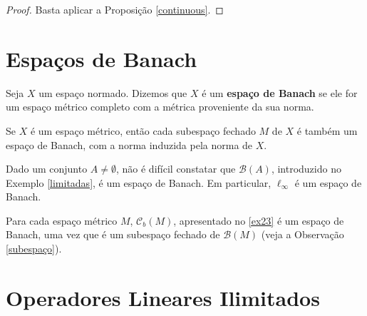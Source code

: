 \begin{proof}
Basta aplicar a Proposição \ref{continuous}.
\end{proof}

\section{Espaços de Banach}

\begin{definition}
    Seja $X$ um espaço normado. Dizemos que $X$ é um \textbf{espaço de Banach} se ele for um espaço métrico completo com a métrica proveniente da sua norma.
\end{definition}

\begin{remark}\label{subespaço}
Se $X$ é um espaço métrico, então cada subespaço fechado $M$ de $X$ é também um espaço de Banach, com a norma induzida pela norma de $X$.
\end{remark}


\begin{example}
Dado um conjunto $A\neq \emptyset$, não  é difícil constatar que $\mathcal B (A)$, introduzido no Exemplo \ref{limitadas}, é um espaço de Banach. Em particular, $\ell _{\infty}$ é um espaço de Banach.
\end{example}

\begin{example}
    Para cada espaço métrico $M$, $\mathcal C _b (M)$, apresentado no \ref{ex23} é um espaço de Banach, uma vez que é um subespaço fechado de $\mathcal B (M)$ (veja a Observação \ref{subespaço}).
\end{example}

\section{Operadores Lineares Ilimitados}

